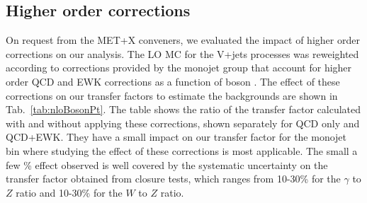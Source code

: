   
\subsection{Higher order corrections}

On request from the MET+X conveners, we evaluated the impact of higher order 
corrections on our analysis. The LO MC for the V+jets processes was reweighted 
according to corrections provided by the monojet group that account for higher 
order QCD and EWK corrections as a function of boson \Pt \cite{Monojet:AN2015-072}. The effect of these 
corrections on our transfer factors to estimate the backgrounds are 
shown in Tab.~\ref{tab:nloBosonPt}. The table shows the ratio of the transfer factor calculated 
with and without applying these corrections, shown separately for QCD only and 
QCD+EWK. They have a small impact on our transfer factor for the monojet bin 
where studying the effect of these corrections is most applicable. The small 
a few \% effect observed is well covered by the systematic uncertainty on the 
transfer factor obtained from closure tests, which ranges from 10-30\% for the 
$\gamma$ to $Z$ ratio and 10-30\% for the $W$ to $Z$ ratio. 



